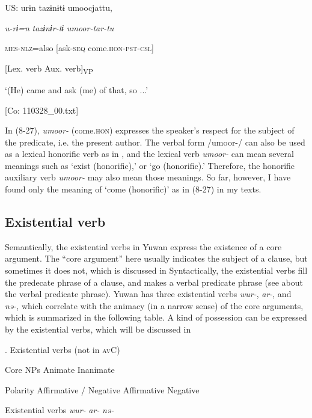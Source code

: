   US:  urɨn  tazɨnɨtɨ  umoocjattu,

    \textit{u-rɨ=n}  \textit{tazɨnɨr-tɨ}  \textit{umoor{}-tar-tu}

    \textsc{mes}-\textsc{nlz}=also  [ask-\textsc{seq}  come.\textsc{hon}-\textsc{pst}-\textsc{csl}]

      [Lex. verb  Aux. verb]\textsubscript{VP}

    ‘(He) came and ask (me) of that, so ...’

    [Co: 110328\_00.txt]

In (8-27), \textit{umoor-} (come.\textsc{hon}) expresses the speaker’s respect for the subject of the predicate, i.e. the present author. The verbal form /umoor-/ can also be used as a lexical honorific verb as in , and the lexical verb \textit{umoor-} can mean several meanings such as ‘exist (honorific),’ or ‘go (honorific).’ Therefore, the honorific auxiliary verb \textit{umoor-} may also mean those meanings. So far, however, I have found only the meaning of ‘come (honorific)’ as in (8-27) in my texts.

\subsection{Existential verb}

Semantically, the existential verbs in Yuwan express the existence of a core argument. The “core argument” here usually indicates the subject of a clause, but sometimes it does not, which is discussed in  Syntactically, the existential verbs fill the predecate phrase of a clause, and makes a verbal predicate phrase (see  about the verbal predicate phrase). Yuwan has three existential verbs \textit{wur-}, \textit{ar-}, and \textit{nə-}, which correlate with the animacy (in a narrow sense) of the core arguments, which is summarized in the following table. A kind of possession can be expressed by the existential verbs, which will be discussed in 

\begin{styleBeschriftung}
\textmd{}\textmd{. Existential verbs (not in \textsc{av}C)}
\end{styleBeschriftung}

Core NPs  Animate  Inanimate

Polarity  Affirmative / Negative  Affirmative  Negative

Existential verbs  \textit{wur-}  \textit{ar-}  \textit{nə-}

